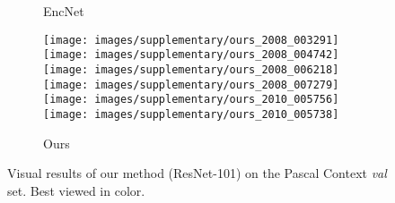 \documentclass[10pt,twocolumn,letterpaper]{article}
\begin{document}
\begin{figure*}[!htb]
\begin{center}
\begin{subfigure}[b]{0.24\linewidth}
      	\caption{EncNet}
    \end{subfigure}
    \hfill
    \begin{subfigure}[b]{0.24\linewidth}
		\texttt{[image: images/supplementary/ours\_2008\_003291]}\\
		\texttt{[image: images/supplementary/ours\_2008\_004742]}\\
		\texttt{[image: images/supplementary/ours\_2008\_006218]}\\
		\texttt{[image: images/supplementary/ours\_2008\_007279]}\\
		\texttt{[image: images/supplementary/ours\_2010\_005756]}\\
		\texttt{[image: images/supplementary/ours\_2010\_005738]}\\
      	\caption{Ours}
    \end{subfigure}    
\end{center}
	\caption{Visual results of our method (ResNet-101) on the Pascal Context \textit{val} set. Best viewed in color.}
	\label{img:visual_first}
\end{figure*}
\end{document}
